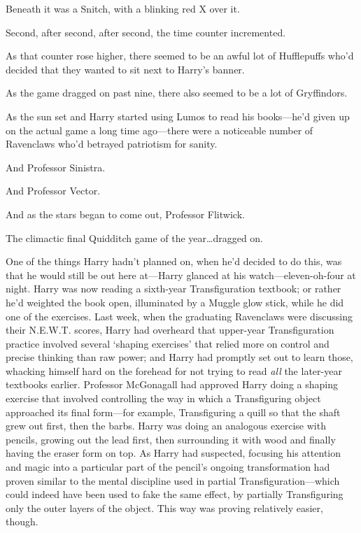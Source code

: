 Beneath it was a Snitch, with a blinking red X over it.

\later

Second, after second, after second, the time counter incremented.

As that counter rose higher, there seemed to be an awful lot of Hufflepuffs who’d decided that they wanted to sit next to Harry’s banner.

As the game dragged on past nine, there also seemed to be a lot of Gryffindors.

As the sun set and Harry started using Lumos to read his books—he’d given up on the actual game a long time ago—there were a noticeable number of Ravenclaws who’d betrayed patriotism for sanity.

And Professor Sinistra.

And Professor Vector.

And as the stars began to come out, Professor Flitwick.

The climactic final Quidditch game of the year…dragged on.

\later

One of the things Harry hadn’t planned on, when he’d decided to do this, was that he would still be out here at—Harry glanced at his watch—eleven-oh-four at night. Harry was now reading a sixth-year Transfiguration textbook; or rather he’d weighted the book open, illuminated by a Muggle glow stick, while he did one of the exercises. Last week, when the graduating Ravenclaws were discussing their N.E.W.T. scores, Harry had overheard that upper-year Transfiguration practice involved several ‘shaping exercises’ that relied more on control and precise thinking than raw power; and Harry had promptly set out to learn those, whacking himself hard on the forehead for not trying to read \emph{all} the later-year textbooks earlier. Professor McGonagall had approved Harry doing a shaping exercise that involved controlling the way in which a Transfiguring object approached its final form—for example, Transfiguring a quill so that the shaft grew out first, then the barbs. Harry was doing an analogous exercise with pencils, growing out the lead first, then surrounding it with wood and finally having the eraser form on top. As Harry had suspected, focusing his attention and magic into a particular part of the pencil’s ongoing transformation had proven similar to the mental discipline used in partial Transfiguration—which could indeed have been used to fake the same effect, by partially Transfiguring only the outer layers of the object. This way was proving relatively easier, though.

